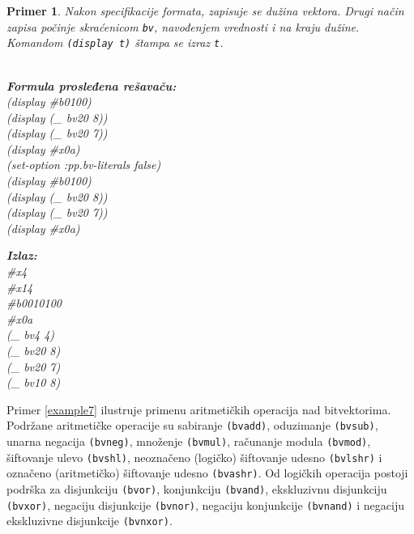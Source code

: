 \documentclass[12pt,oneside]{memoir}
\newtheorem{primer}{Primer}
\begin{document}
\begin{primer} \label{example6} 
Nakon specifikacije formata, zapisuje se dužina vektora. Drugi način zapisa počinje skraćenicom \texttt{bv}, navođenjem vrednosti i na kraju dužine. Komandom \texttt{(display t)} štampa se izraz \texttt{t}.\\\\
\begin{minipage}[b]{0.45\textwidth}
\textbf{Formula prosleđena rešavaču:}
\\(display \#b0100)
\\(display (\_ bv20 8))
\\(display (\_ bv20 7))
\\(display \#x0a) 
\\(set-option :pp.bv-literals false)
\\(display \#b0100)
\\(display (\_ bv20 8))
\\(display (\_ bv20 7))
\\(display \#x0a)
\end{minipage}
\hspace{2.5cm}
\begin{minipage}[t]{0.4\textwidth}
\vspace{-5.93cm}
\textbf{Izlaz:}
\\\#x4 
\\\#x14 
\\\#b0010100 
\\\#x0a 
\\(\_ bv4 4) 
\\(\_ bv20 8) 
\\(\_ bv20 7) 
\\(\_ bv10 8)
\end{minipage}
\end{primer}
\par Primer \ref{example7} ilustruje primenu aritmetičkih operacija nad bitvektorima. Podržane aritmetičke operacije su sabiranje \texttt{(bvadd)}, oduzimanje \texttt{(bvsub)}, unarna negacija \texttt{(bvneg)}, množenje \texttt{(bvmul)}, računanje modula \texttt{(bvmod)}, šiftovanje ulevo \texttt{(bvshl)}, neoznačeno (logičko) šiftovanje udesno \texttt{(bvlshr)} i označeno (aritmetičko) šiftovanje udesno \texttt{(bvashr)}. Od logičkih operacija postoji podrška za disjunkciju \texttt{(bvor)}, konjunkciju \texttt{(bvand)}, ekskluzivnu disjunkciju \texttt{(bvxor)}, negaciju disjunkcije \texttt{(bvnor)}, negaciju konjunkcije \texttt{(bvnand)} i negaciju ekskluzivne disjunkcije \texttt{(bvnxor)}.
\end{document}
